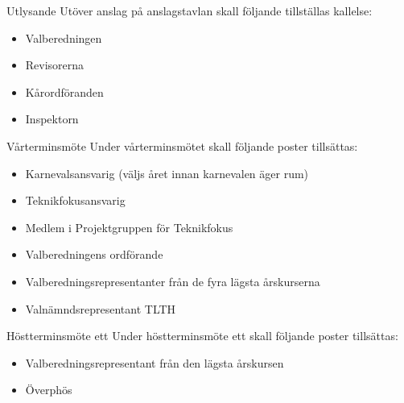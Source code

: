 \documentclass[pdfbookmarks,a4paper,11pt]{article}
\newlength{\itemcollength}
\newenvironment{reglemlista}{%
  \begin{list}{}{%
      \setlength{\labelwidth}{\itemcollength}%
      \setlength{\leftmargin}{\labelwidth + \labelsep}%
      \renewcommand{\makelabel}[1]{%
        \raisebox{0pt}[1ex][0pt]{%
          \makebox[\labelwidth][l]{%
            \parbox[t]{\itemcollength}{%
              \raggedright\hspace{0pt}##1}}}\hfill}%
      }}{%
  \end{list}}
\begin{document}
\begin{reglemlista}

  \item[Utlysande]
    Utöver anslag på anslagstavlan skall följande tillställas kallelse:
    \begin{itemize}
      \item Valberedningen
      \item Revisorerna
      \item Kårordföranden
      \item Inspektorn
    \end{itemize}

  \item[Vårterminsmöte]
    Under vårterminsmötet skall följande poster tillsättas:
    \begin{itemize}

      \item Karnevalsansvarig (väljs året innan karnevalen äger rum)
      \item Teknikfokusansvarig
      \item Medlem i Projektgruppen för Teknikfokus
      \item Valberedningens ordförande
      \item Valberedningsrepresentanter från de fyra lägsta årskurserna
      \item Valnämndsrepresentant TLTH
    \end{itemize}

  \item[Höstterminsmöte ett]
    Under höstterminsmöte ett skall följande poster tillsättas:
    \begin{itemize}
      \item Valberedningsrepresentant från den lägsta årskursen
      \item Överphös
    \end{itemize}


\end{reglemlista}
\end{document}

